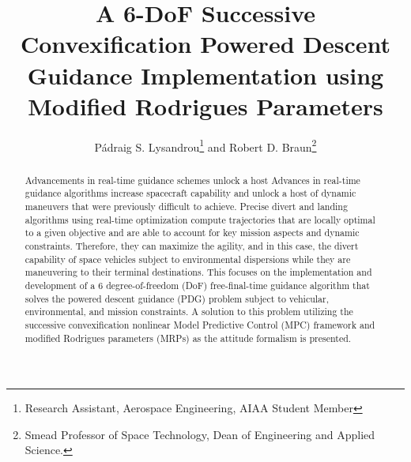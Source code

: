 \documentclass[conf]{new-aiaa}
\title{A 6-DoF Successive Convexification Powered Descent Guidance Implementation using Modified Rodrigues Parameters}
\author{Pádraig S. Lysandrou\footnote{Research Assistant, Aerospace Engineering, AIAA Student Member} and Robert D. Braun\footnote{Smead Professor of Space Technology, Dean of Engineering and Applied Science.}}
\affil{University of Colorado Boulder, Boulder, CO 80309}
\begin{document}
\maketitle

\begin{abstract}
	
	Advancements in real-time guidance schemes unlock a host 
	Advances in real-time guidance algorithms increase spacecraft capability and unlock a host of dynamic maneuvers that were previously difficult to achieve. Precise divert and landing algorithms using real-time optimization compute trajectories that are locally optimal to a given objective and are able to account for key mission aspects and dynamic constraints. Therefore, they can maximize the agility, and in this case, the divert capability of space vehicles subject to environmental dispersions while they are maneuvering to their terminal destinations. This focuses on the implementation and development of a 6 degree-of-freedom (DoF) free-final-time guidance algorithm that solves the powered descent guidance (PDG) problem subject to vehicular, environmental, and mission constraints. A solution to this problem utilizing the successive convexification nonlinear Model Predictive Control (MPC) framework and modified Rodrigues parameters (MRPs) as the attitude formalism is presented. 
\end{abstract}

\end{document}
